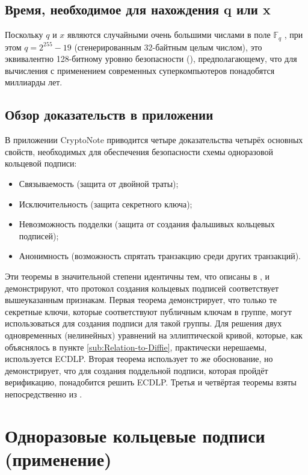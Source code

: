 \documentclass{mrl}
\numberwithin{equation}{section}
\numberwithin{figure}{section}
\begin{document}
\subsection{\label{sub:Time-Cost-to}Время, необходимое для нахождения q или x}

Поскольку $q$ и $x$ являются случайными очень большими числами в поле $\mathbb{F}_{q}$ , при этом $q=2^{255}-19$ (сгенерированным 32-байтным целым числом), это эквивалентно 128-битному уровню безопасности (\cite{BCPM}), предполагающему, что для вычисления с применением современных суперкомпьютеров понадобятся миллиарды лет.


\subsection{Обзор доказательств в приложении}

В приложении CryptoNote приводится четыре доказательства четырёх основных свойств, необходимых для обеспечения безопасности схемы одноразовой кольцевой подписи:
\begin{itemize}
\item Связываемость (защита от двойной траты);
\item Исключительность (защита секретного ключа);
\item Невозможность подделки (защита от создания фальшивых кольцевых подписей);
\item Анонимность (возможность спрятать транзакцию среди других транзакций).
\end{itemize}
Эти теоремы в значительной степени идентичны тем, что описаны в \cite{FS}, и демонстрируют, что протокол создания кольцевых подписей соответствует вышеуказанным признакам. Первая теорема демонстрирует, что только те секретные ключи, которые соответствуют публичным ключам в группе, могут использоваться для создания подписи для такой группы. Для решения двух одновременных (нелинейных) уравнений на эллиптической кривой, которые, как объяснялось в пункте \ref{sub:Relation-to-Diffie}, практически нерешаемы, используется ECDLP. Вторая теорема использует то же обоснование, но демонстрирует, что для создания поддельной подписи, которая пройдёт верификацию, понадобится решить ECDLP. Третья и четвёртая теоремы взяты непосредственно из \cite{FS}.

\section{Одноразовые кольцевые подписи (применение)}
\end{document}
